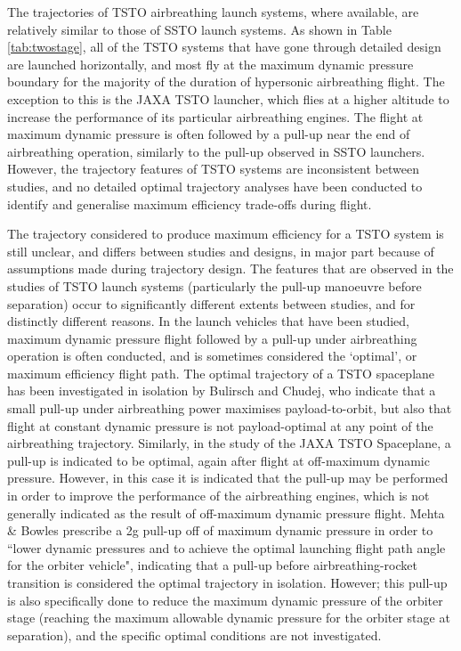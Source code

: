 The trajectories of TSTO airbreathing launch systems, where available, are relatively similar to those of SSTO launch systems. As shown in Table \ref{tab:twostage}, all of the TSTO systems that have gone through detailed design are launched horizontally, and most fly at the maximum dynamic pressure boundary for the majority of the duration of hypersonic airbreathing flight\cite{Wilhite1991, Mehta2001, Takahashi1997, Eklund2012,Bulirsch1995,Bradford2002}. The exception to this is the JAXA TSTO launcher\cite{Fujikawa2017}, which flies at a higher altitude to increase the performance of its particular airbreathing engines. The flight at maximum dynamic pressure is often followed by a pull-up near the end of airbreathing operation, similarly to the pull-up observed in SSTO launchers\cite{Wilhite1991, Fujikawa2017, Mehta2001, Takahashi1997, Eklund2012}. 
However, the trajectory features of TSTO systems are inconsistent between studies, and no detailed optimal trajectory analyses have been conducted to identify and generalise maximum efficiency trade-offs during flight. 

The trajectory considered to produce maximum efficiency for a TSTO system is still unclear, and differs between studies and designs, in major part because of assumptions made during trajectory design. 
The features that are observed in the studies of TSTO launch systems (particularly the pull-up manoeuvre before separation) occur to significantly different extents between studies, and for distinctly different reasons. 
In the launch vehicles that have been studied, maximum dynamic pressure flight followed by a pull-up under airbreathing operation is often conducted\cite{Wilhite1991, Mehta2001, Takahashi1997, Eklund2012}, and is sometimes considered the `optimal', or maximum efficiency flight path\cite{Bulirsch1995,Fujikawa2017,Mehta2001}.
The optimal trajectory of a TSTO spaceplane has been investigated in isolation by Bulirsch and Chudej\cite{Bulirsch1995}, who indicate that a small pull-up under airbreathing power maximises payload-to-orbit, but also that flight at constant dynamic pressure is not payload-optimal at any point of the airbreathing trajectory. Similarly, in the study of the JAXA TSTO Spaceplane\cite{Fujikawa2017}, a pull-up is indicated to be optimal, again after flight at off-maximum dynamic pressure. However, in this case it is indicated that the pull-up may be performed in order to improve the performance of the airbreathing engines, which is not generally indicated as the result of off-maximum dynamic pressure flight. 
Mehta \& Bowles\cite{Mehta2001} prescribe a 2g pull-up off of maximum dynamic pressure in order to ``lower dynamic pressures and to achieve the optimal launching flight path angle for the orbiter vehicle", indicating that a pull-up before airbreathing-rocket transition is considered the optimal trajectory in isolation. However; this pull-up is also specifically done to reduce the maximum dynamic pressure of the orbiter stage (reaching the maximum allowable dynamic pressure for the orbiter stage at separation), and the specific optimal conditions are not investigated. 

